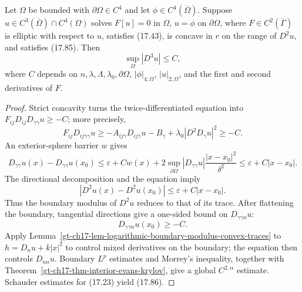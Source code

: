 \begin{theorem}
\label{gt-ch17-thm-global-third-derivative-strict-concavity}
Let $\Omega$ be bounded with $\partial\Omega\in C^4$ and let
$\phi\in C^4(\overline\Omega)$.  Suppose
$u\in C^3(\overline\Omega)\cap C^4(\Omega)$ solves
$F[u]=0$ in $\Omega$, $u=\phi$ on $\partial\Omega$, where
$F\in C^2(\overline\Gamma)$ is elliptic with respect to $u$, satisfies
(17.43), is concave in $r$ on the range of $D^2u$, and satisfies (17.85).
Then
\begin{equation}\tag{17.86}
\sup_\Omega|D^3u|\le C,
\end{equation}
where $C$ depends on $n,\lambda,\Lambda,\lambda_0,\partial\Omega$,
$|\phi|_{4;\Omega}$, $|u|_{2;\Omega}$, and the first and second derivatives
of $F$.
\end{theorem}
\begin{proof}
\sketch Strict concavity turns the twice-differentiated equation into
$F_{ij}D_{ij}D_{\gamma\gamma}u\ge-C$; more precisely,
\begin{equation}
\tag{17.87}
F_{ij}D_{ij\gamma\gamma}u
\geq-A_{ij\gamma}D_{ij\gamma}u-B_\gamma
+\lambda_0|D^2D_\gamma u|^2\geq-C.
\end{equation}
An exterior-sphere barrier $w$ gives
\begin{equation}
\tag{17.88}
D_{\gamma\gamma}u(x)-D_{\gamma\gamma}u(x_0)
\leq\varepsilon+Cw(x)+2\sup_{\partial\Omega}|D_{\gamma\gamma}u|
\frac{|x-x_0|^2}{\delta^2}
\leq\varepsilon+C|x-x_0|.
\end{equation}
The directional decomposition and the equation imply
\begin{equation}
\tag{17.89}
|D^2u(x)-D^2u(x_0)|\leq\varepsilon+C|x-x_0|.
\end{equation}
Thus the boundary modulus of $D^2u$ reduces to that of its trace. After
flattening the boundary, tangential directions give a one-sided bound on
$D_{\gamma\gamma n}u$:
\begin{equation}
\tag{17.90}
D_{\gamma\gamma n}u(x_0)\geq-C.
\end{equation}
Apply
Lemma~\ref{gt-ch17-lem-logarithmic-boundary-modulus-convex-traces} to
$h=D_nu+k|x|^2$ to control mixed derivatives on the boundary; the equation
then controls $D_{nn}u$.  Boundary $L^p$ estimates and Morrey's inequality,
together with Theorem~\ref{gt-ch17-thm-interior-evans-krylov}, give a global
$C^{2,\alpha}$ estimate.  Schauder
estimates for (17.23) yield (17.86).
\end{proof}

